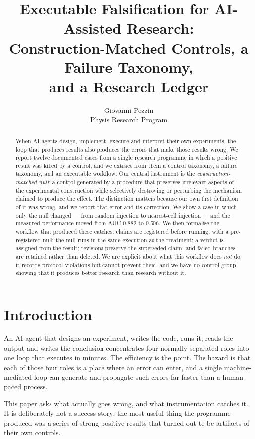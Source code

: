 \documentclass[11pt]{article}
\title{Executable Falsification for AI-Assisted Research:\\
Construction-Matched Controls, a Failure Taxonomy,\\
and a Research Ledger}
\author{Giovanni Pezzin \\ Physis Research Program}
\date{}
\begin{document}
\maketitle

\begin{abstract}
When AI agents design, implement, execute and interpret their own
experiments, the loop that produces results also produces the errors that
make those results wrong. We report twelve documented cases from a
single research programme in which a positive result was killed by a
control, and we extract from them a control taxonomy, a failure taxonomy,
and an executable workflow. Our central instrument is the
\emph{construction-matched null}: a control generated by a procedure that
preserves irrelevant aspects of the experimental construction while
selectively destroying or perturbing the mechanism claimed to produce the
effect. The distinction matters because our own first definition of it was
wrong, and we report that error and its correction. We show a case in
which only the null changed --- from random injection to nearest-cell
injection --- and the measured performance moved from AUC 0.882 to 0.506.
We then formalise the workflow that produced these catches: claims are
registered before running, with a pre-registered null; the null runs in
the same execution as the treatment; a verdict is assigned from the result;
revisions preserve the superseded claim; and failed branches are retained
rather than deleted. We are explicit about what this workflow does
\emph{not} do: it records protocol violations but cannot prevent them, and
we have no control group showing that it produces better research than
research without it.
\end{abstract}

\section{Introduction}

An AI agent that designs an experiment, writes the code, runs it, reads the
output and writes the conclusion concentrates four normally-separated
roles into one loop that executes in minutes. The efficiency is the point.
The hazard is that each of those four roles is a place where an error can
enter, and a single machine-mediated loop can generate and propagate such
errors far faster than a human-paced process.

This paper asks what actually goes wrong, and what instrumentation catches
it. It is deliberately not a success story: the most useful thing the
programme produced was a series of strong positive results that turned out
to be artifacts of their own controls.
\end{document}
